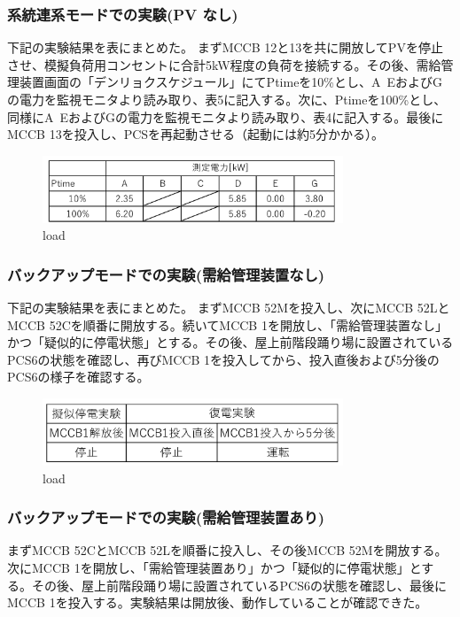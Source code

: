 \documentclass[a4paper,11pt,xelatex,ja=standard]{bxjsarticle}
\begin{document}
                \subsubsection{系統連系モードでの実験(PV なし)}
                    下記の実験結果を表にまとめた。
                    まずMCCB 12と13を共に開放してPVを停止させ、模擬負荷用コンセントに合計5kW程度の負荷を接続する。その後、需給管理装置画面の「デンリョクスケジュール」にてPtimeを10\%とし、A~EおよびGの電力を監視モニタより読み取り、表5に記入する。次に、Ptimeを100\%とし、同様にA~EおよびGの電力を監視モニタより読み取り、表4に記入する。最後にMCCB 13を投入し、PCSを再起動させる（起動には約5分かかる）。
                    \begin{figure}[H]
                        \centering
                        \includegraphics[width=0.8\textwidth]{./img/24-1/3.png}
                        \caption{load}
                    \end{figure}

                \subsubsection{バックアップモードでの実験(需給管理装置なし)}
                    下記の実験結果を表にまとめた。
                    まずMCCB 52Mを投入し、次にMCCB 52LとMCCB 52Cを順番に開放する。続いてMCCB 1を開放し、「需給管理装置なし」かつ「疑似的に停電状態」とする。その後、屋上前階段踊り場に設置されているPCS6の状態を確認し、再びMCCB 1を投入してから、投入直後および5分後のPCS6の様子を確認する。
                    \begin{figure}[H]
                        \centering
                        \includegraphics[width=0.8\textwidth]{./img/24-1/4.png}
                        \caption{load}
                    \end{figure}

                \subsubsection{バックアップモードでの実験(需給管理装置あり)}
                    まずMCCB 52CとMCCB 52Lを順番に投入し、その後MCCB 52Mを開放する。次にMCCB 1を開放し、「需給管理装置あり」かつ「疑似的に停電状態」とする。その後、屋上前階段踊り場に設置されているPCS6の状態を確認し、最後にMCCB 1を投入する。実験結果は開放後、動作していることが確認できた。
\end{document}

